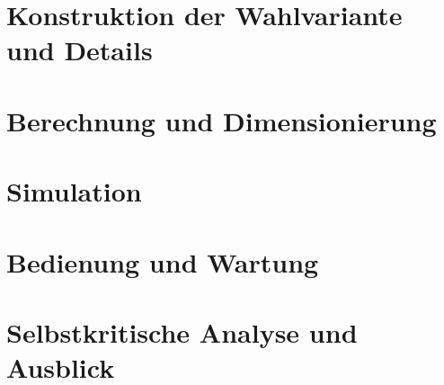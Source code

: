 \section{Konstruktion der Wahlvariante und Details}
\section{Berechnung und Dimensionierung}
\section{Simulation}
\section{Bedienung und Wartung}
\section{Selbstkritische Analyse und Ausblick}

